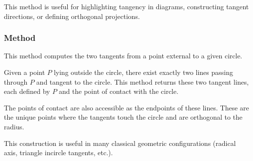 \medskip
\noindent
This method is useful for highlighting tangency in diagrams, constructing tangent directions, or defining orthogonal projections.

\vspace{1em}


\begin{minipage}{.5\textwidth}
\end{minipage}
\begin{minipage}{.5\textwidth}
\begin{tkzexample}
\end{tkzexample}
\end{minipage}


\subsubsection{Method } %
\label{ssub:method_circle_tangent__from_pt}

This method computes the two tangents from a point external to a given circle.

\medskip
\noindent
Given a point $P$ lying outside the circle, there exist exactly two lines passing through $P$ and tangent to the circle. This method returns these two tangent lines, each defined by $P$ and the point of contact with the circle.

\medskip
\noindent
The points of contact are also accessible as the endpoints of these lines. These are the unique points where the tangents touch the circle and are orthogonal to the radius.

\medskip
\noindent
This construction is useful in many classical geometric configurations (radical axis, triangle incircle tangents, etc.).

\vspace{1em}


